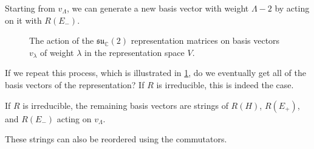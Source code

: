 Starting from $v_{\Lambda}$, we can generate a new basis vector with weight $\Lambda -2$ by acting on it with $R(E_-)$. 
\begin{figure}[btp]
  \centering
  \def\svgwidth{0.9\columnwidth}
  
  \caption{The action of the $\mathfrak{su}_{\mathbb{C}}(2)$ representation matrices on basis vectors $v_{\lambda}$ of weight $\lambda$ in the representation space $V$.}
  \label{fig:l11f1}
\end{figure}
If we repeat this process, which is illustrated in \ref{fig:l11f1}, do we eventually get all of the basis vectors of the representation? If $R$ is irreducible, this is indeed the case.
\begin{claim}
  If $R$ is irreducible, the remaining basis vectors are strings of $R(H)$, $R(E_+)$, and $R(E_-)$ acting on $v_\Lambda$.
\end{claim}
\begin{leftbar}
  \begin{remark}
    These strings can also be reordered using the commutators.
  \end{remark}
\end{leftbar}
